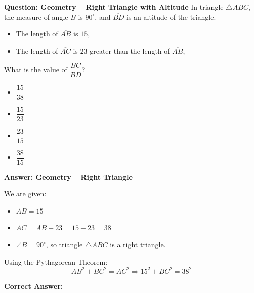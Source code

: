 \documentclass{beamer}
\begin{document}
\begin{frame}{\textbf{Question: Geometry – Right Triangle with Altitude}}
In triangle \( \triangle ABC \), the measure of angle \( B \) is \( 90^\circ \), and \( \overline{BD} \) is an altitude of the triangle.

\begin{itemize}
    \item The length of \( \overline{AB} \) is \( 15 \),
    \item The length of \( \overline{AC} \) is \( 23 \) greater than the length of \( \overline{AB} \),
\end{itemize}

What is the value of \( \dfrac{BC}{BD} \)?

\begin{itemize}
    \item[A.] \( \dfrac{15}{38} \)
    \item[B.] \( \dfrac{15}{23} \)
    \item[C.] \( \dfrac{23}{15} \)
    \item[D.] \( \dfrac{38}{15} \)
\end{itemize}
\end{frame}
\begin{frame}{\textbf{Answer: Geometry – Right Triangle }}

We are given:
\begin{itemize}
    \item \( AB = 15 \)
    \item \( AC = AB + 23 = 15 + 23 = 38 \)
    \item \( \angle B = 90^\circ \), so triangle \( \triangle ABC \) is a right triangle.
\end{itemize}

Using the Pythagorean Theorem:
\[
AB^2 + BC^2 = AC^2 \Rightarrow 15^2 + BC^2 = 38^2
\]


\textbf{Correct Answer:} 
\end{frame}
\end{document}
